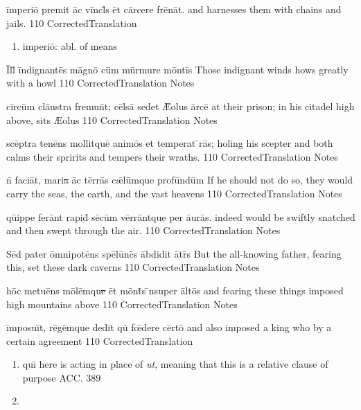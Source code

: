 \latline
  {\=imp\-er\-i\={\macron o} pr\-em\-it \=ac v\=incl\={\macron {\i}}s \=et c\=arc\-er\-e fr\={\macron e}n\=at.
}
  { and harnesses them with chains and jails. }
  {110}
  { CorrectedTranslation }
  { \begin{enumerate}
  	\item imperi\={o}:  abl. of means
  \end{enumerate} }


\latline
  {\=Ill\={\macron {\i}} \=ind\-ign\-ant\={\macron e}s m\=agn\={\macron o} c\=um m\=urm\-ur\-e m\=ont\=is
}
  { Those indignant winds hows greatly with a howl }
  {110}
  { CorrectedTranslation }
  { Notes }


\latline
  {c\=irc\=um cl\={au}str\-a fr\-emu\=nt; c\=els\={\macron a} s\-ed\-et \={\AE}\-ol\-us \=arc\=e
}
  { at their prison; in his citadel high above, sits {\AE}olus }
  {110}
  { CorrectedTranslation }
  { Notes }


\latline
  {sc\={\macron e}ptr\-a t\-en\={\macron e}ns m\-oll\-itqu\=e \-an\-im\={\macron o}s et temperat \={\macron {\i}}r\={\macron a}s;
}
  { holing his scepter and both calms their spririts and tempers their wraths. }
  {110}
  { CorrectedTranslation }
  { Notes }


\latline
  {n\={\macron {\i}} f\-ac\-i\=at, m\-ar\-i\sout{a }\=ac t\=err\={\macron a}s c\={\ae}l\=umqu\-e pr\-of\=und\=um
}
  { If he should not do so, they would carry the seas, the earth, and the vast heavens }
  {110}
  { CorrectedTranslation }
  { Notes }


\latline
  {q\={ui}pp\-e f\-er\=ant r\-ap\-id\={\macron {\i}} s\={\macron e}c\=um v\=err\=antqu\-e p\-er \={au}r\={\macron a}s.
}
  { indeed would be swiftly snatched and then swept through the air. }
  {110}
  { CorrectedTranslation }
  { Notes }


\latline
  {S\=ed p\-at\-er \=omn\-ip\-ot\={\macron e}ns sp\={\macron e}l\=unc\={\macron {\i}}s \=abd\-id\-it \={\macron a}tr\={\macron {\i}}s
}
  { But the all-knowing father, fearing this, set these dark caverns }
  {110}
  { CorrectedTranslation }
  { Notes }


\latline
  {h\=oc m\-et\-u\={\macron e}ns m\={\macron o}l\=emqu\sout{e }\=et m\=ont\={\macron {\i}}s \={\macron {\i}}ns\-upe\-r \=alt\={\macron o}s
}
  { and fearing these things imposed high mountains above }
  {110}
  { CorrectedTranslation }
  { Notes }


\latline
  {\=imp\-os\-u\=it, r\={\macron e}g\=emqu\-e d\-ed\=it qu\={\macron {\i}} f\={\oe}d\-er\-e c\=ert\={\macron o}
}
  { and also imposed a king who by a certain agreement }
  {110}
  { CorrectedTranslation }
  { \begin{enumerate}
  	\item qu\={\i} here is acting in place of \emph{ut}, meaning that this is a relative clause of purpose ACC. 389
  	\item 
  \end{enumerate} }


